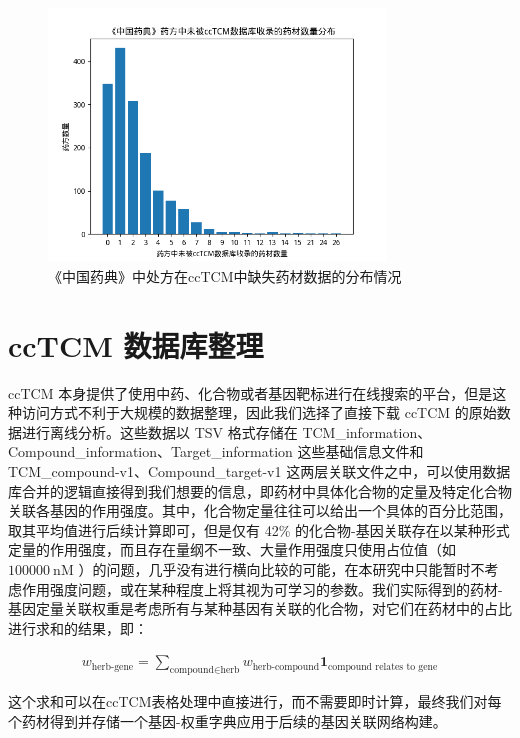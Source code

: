 \begin{figure}[H]
  \centering
  \includegraphics[width=0.8\textwidth]{figures/unlisted_medicinals_distribution.png}
  \caption{《中国药典》中处方在ccTCM中缺失药材数据的分布情况}
  \label{fig:missing_herbs}
\end{figure}

\section{ccTCM 数据库整理}

ccTCM 本身提供了使用中药、化合物或者基因靶标进行在线搜索的平台，但是这种访问方式不利于大规模的数据整理，因此我们选择了直接下载 ccTCM 的原始数据进行离线分析。这些数据以 TSV 格式存储在 {TCM\_information}、{Compound\_information}、{Target\_information} 这些基础信息文件和 {TCM\_compound-v1}、{Compound\_target-v1} 这两层关联文件之中，可以使用数据库合并的逻辑直接得到我们想要的信息，即药材中具体化合物的定量及特定化合物关联各基因的作用强度。其中，化合物定量往往可以给出一个具体的百分比范围，取其平均值进行后续计算即可，但是仅有 42\% 的化合物-基因关联存在以某种形式定量的作用强度，而且存在量纲不一致、大量作用强度只使用占位值（如 $100000~\mathrm{nM}$ ）的问题，几乎没有进行横向比较的可能，在本研究中只能暂时不考虑作用强度问题，或在某种程度上将其视为可学习的参数。我们实际得到的药材-基因定量关联权重是考虑所有与某种基因有关联的化合物，对它们在药材中的占比进行求和的结果，即：


\begin{align}
w_{\text{herb-gene}} = \sum_{\text{compound} \in \text{herb}} w_{\text{herb-compound}} \mathbf{1}_{\text{compound relates to gene}}
\end{align}

这个求和可以在ccTCM表格处理中直接进行，而不需要即时计算，最终我们对每个药材得到并存储一个基因-权重字典应用于后续的基因关联网络构建。

